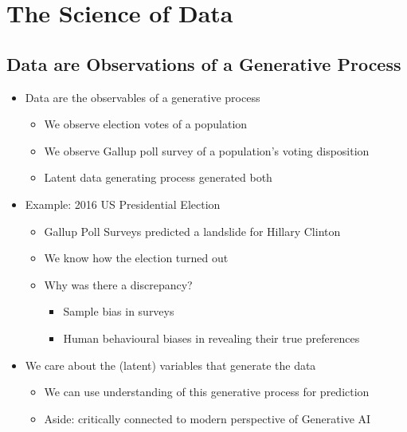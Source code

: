 \documentclass[11pt]{article}
\theoremstyle{definition}
\begin{document}
\section{The Science of Data}
\subsection{Data are Observations of a Generative Process}
\begin{itemize}
  \item Data are the observables of a generative process
  \begin{itemize}
    \item We observe election votes of a population
    \item We observe Gallup poll survey of a population’s voting disposition
    \item Latent data generating process generated both
  \end{itemize}
  \item Example: 2016 US Presidential Election
  \begin{itemize}
    \item Gallup Poll Surveys predicted a landslide for Hillary Clinton
    \item We know how the election turned out
    \item Why was there a discrepancy?
    \begin{itemize}
      \item Sample bias in surveys
      \item Human behavioural biases in revealing their true preferences
    \end{itemize}
  \end{itemize}
  \item We care about the (latent) variables that generate the data
  \begin{itemize}
    \item We can use understanding of this generative process for prediction
    \item Aside: critically connected to modern perspective of Generative AI
  \end{itemize}
\end{itemize}
\end{document}
